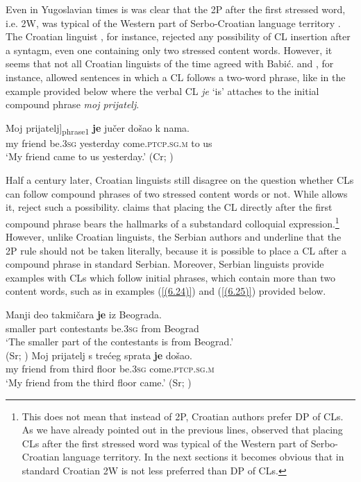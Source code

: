Even in Yugoslavian times is was clear that the 2P after the first stressed word, i.e. 2W, was typical of the Western part of Serbo-Croatian language territory \citep[cf.][307]{Pesikan58}. The Croatian linguist \citet[154f]{Babic64}, for instance, rejected any possibility of CL insertion after a syntagm, even one containing only two stressed content words. However, it seems that not all Croatian linguists of the time agreed with Babić. \citet[434]{BMPV71} and \citet[146f]{Brabec65}, for instance, allowed sentences in which a CL follows a two-word phrase, like in the example provided below where the verbal CL \textit{je} ‘is’ attaches to the initial compound phrase \textit{moj prijatelj}.

\begin{exe}\ex\label{(6.23)}
\gll \minsp{[} Moj prijatelj]\textsubscript{phrase1} \textbf{je} jučer došao k nama.\\
 {} my friend be\textsc{.3sg} yesterday come\textsc{.ptcp.sg.m} to us\\
\glt ‘My friend came to us yesterday.’
\hfill (Cr; \citealt[434]{BMPV71})
\end{exe}

\largerpage
\noindent Half a century later, Croatian linguists still disagree on the question whether CLs can follow compound phrases of two stressed content words or not. While \citet[344]{Raguz97} allows it, \citet[182]{FHM06} reject such a possibility. \citet[496f]{Katicic86} claims that placing the CL directly after the first compound phrase bears the hallmarks of a substandard colloquial expression.\footnote{This does not mean that instead of 2P, Croatian authors prefer DP of CLs. As we have already pointed out in the previous lines, \citet[307]{Pesikan58} observed that placing CLs after the first stressed word was typical of the Western part of Serbo-Croatian language territory. In the next sections it becomes obvious that in standard Croatian 2W is not less preferred than DP of CLs.} However, unlike Croatian linguists, the Serbian authors \citet[29, 450]{PiperKlajn14} and \citet[161]{IKPB11} underline that the 2P rule should not be taken literally, because it is possible to place a CL after a compound phrase in standard Serbian. Moreover, Serbian linguists provide examples with CLs which follow initial phrases, which contain more than two content words, such as in examples (\ref{(6.24)}) and (\ref{(6.25)}) provided below. 

\begin{exe}\ex\label{(6.24)}
\gll Manji deo takmičara \textbf{je} iz Beograda.\\
 smaller part contestants be\textsc{.3sg} from Beograd \\
\glt ‘The smaller part of the contestants is from Beograd.’ \\
\hfill (Sr; \citealt[161]{IKPB11})
\ex\label{(6.25)}
\gll Moj prijatelj s trećeg sprata \textbf{je} došao.\\
 my friend from third floor be\textsc{.3sg} come\textsc{.ptcp.sg.m} \\
\glt ‘My friend from the third floor came.’ 
\hfill (Sr; \citealt[450]{PiperKlajn14})
\end{exe}

